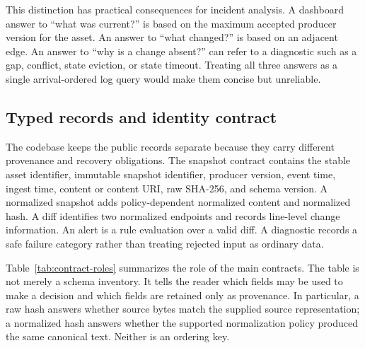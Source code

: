 \documentclass[a4paper,11pt]{article}
\begin{document}
This distinction has practical consequences for incident analysis. A dashboard answer to ``what was current?'' is based on the maximum accepted producer version for the asset. An answer to ``what changed?'' is based on an adjacent edge. An answer to ``why is a change absent?'' can refer to a diagnostic such as a gap, conflict, state eviction, or state timeout. Treating all three answers as a single arrival-ordered log query would make them concise but unreliable.

\subsection{Typed records and identity contract}

The codebase keeps the public records separate because they carry different provenance and recovery obligations. The snapshot contract contains the stable asset identifier, immutable snapshot identifier, producer version, event time, ingest time, content or content URI, raw SHA-256, and schema version. A normalized snapshot adds policy-dependent normalized content and normalized hash. A diff identifies two normalized endpoints and records line-level change information. An alert is a rule evaluation over a valid diff. A diagnostic records a safe failure category rather than treating rejected input as ordinary data.

Table~\ref{tab:contract-roles} summarizes the role of the main contracts. The table is not merely a schema inventory. It tells the reader which fields may be used to make a decision and which fields are retained only as provenance. In particular, a raw hash answers whether source bytes match the supplied source representation; a normalized hash answers whether the supported normalization policy produced the same canonical text. Neither is an ordering key.
\end{document}
